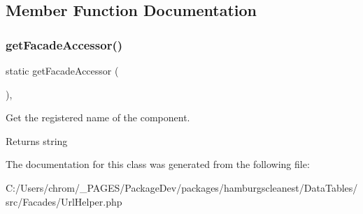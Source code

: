 \subsection{Member Function Documentation}
\mbox{\label{classhamburgscleanest_1_1_data_tables_1_1_facades_1_1_url_helper_a19a808201f41f32f71a0532cb49b450f}} 
\subsubsection{\texorpdfstring{get\+Facade\+Accessor()}{getFacadeAccessor()}}
{\footnotesize\ttfamily static get\+Facade\+Accessor (\begin{DoxyParamCaption}{ }\end{DoxyParamCaption})\hspace{0.3cm}{\ttfamily [static]}, {\ttfamily [protected]}}

Get the registered name of the component.

\begin{DoxyReturn}{Returns}
string 
\end{DoxyReturn}


The documentation for this class was generated from the following file\+:\begin{DoxyCompactItemize}
\item 
C\+:/\+Users/chrom/\+\_\+\+P\+A\+G\+E\+S/\+Package\+Dev/packages/hamburgscleanest/\+Data\+Tables/src/\+Facades/Url\+Helper.\+php\end{DoxyCompactItemize}
